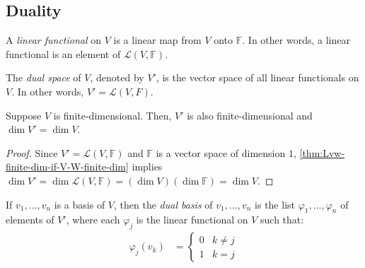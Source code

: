 \documentclass{article}
\begin{document}
\subsection{Duality}

\begin{definition}
  \label{def:linear-functional}
  A \textit{linear functional} on $V$ is a linear map from $V$ onto
  $\mathbb{F}$. In other words, a linear functional is an element of
  $\mathcal{L}(V, \mathbb{F})$.
\end{definition}

\begin{definition}
  The \textit{dual space} of $V$, denoted by $V'$, is the vector space
  of all linear functionals on $V$. In other words, $V' =
  \mathcal{L}(V, F)$.
\end{definition}

\begin{theorem}[$\dim V' = \dim V$]
  \label{thm:dim-dual-space-equal-dim-space}
  Suppose $V$ is finite-dimensional. Then, $V'$ is also
  finite-dimensional and $\dim V' = \dim V$.
\end{theorem}
\begin{proof}
  Since $V' = \mathcal{L}(V, \mathbb{F})$ and $\mathbb{F}$ is a vector
  space of dimension $1$, \cref{thm:Lvw-finite-dim-if-V-W-finite-dim}
  implies $\dim V' = \dim \mathcal{L}(V, \mathbb{F}) = (\dim V)(\dim
  \mathbb{F}) = \dim V$.
\end{proof}

\begin{definition}
  \label{def:dual-basis}
  If $v_1, ..., v_n$ is a basis of $V$, then the \textit{dual basis}
  of $v_1, ..., v_n$ is the list $\varphi_1, ..., \varphi_n$ of
  elements of $V'$, where each $\varphi_j$ is the linear functional on
  $V$ such that:
  \begin{align*}
    \varphi_j(v_k) &= \begin{cases}
      0 & k \ne j \\
      1 & k = j
    \end{cases}
  \end{align*}
\end{definition}
\end{document}

